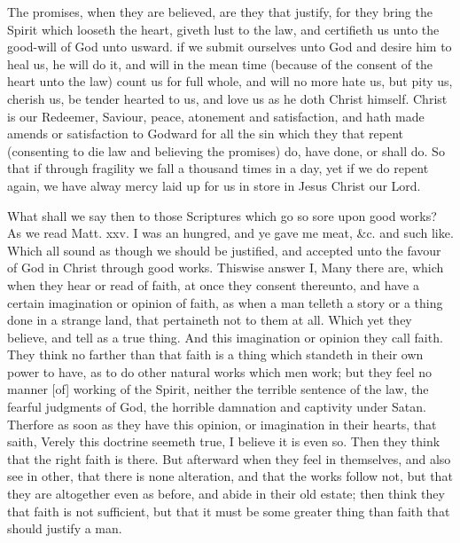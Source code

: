 The promises, when they are believed, are they that
justify, for they bring the Spirit which looseth the heart, 
giveth lust to the law, and certifieth us unto the good-will 
of God unto usward. if we submit ourselves unto God 
and desire him to heal us, he will do it, and will in the 
mean time (because of the consent of the heart unto the 
law) count us for full whole, and will no more hate us, but 
pity us, cherish us, be tender hearted to us, and love us as 
he doth Christ himself. Christ is our Redeemer, Saviour, 
peace, atonement and satisfaction, and hath made amends 
or satisfaction to Godward for all the sin which they that 
repent (consenting to die law and believing the promises) 
do, have done, or shall do. So that if through fragility 
we fall a thousand times in a day, yet if we do repent 
again, we have alway mercy laid up for us in store in Jesus 
Christ our Lord. 


What shall we say then to those Scriptures which go so 
sore upon good works? As we read Matt. xxv. I was 
an hungred, and ye gave me meat, \&c. and such like. 
Which all sound as though we should be justified, and
accepted unto the favour of God in Christ through good 
works. Thiswise answer I, Many there are, which when 
they hear or read of faith, at once they consent thereunto, 
and have a certain imagination or opinion of faith, as when 
a man telleth a story or a thing done in a strange land, that 
pertaineth not to them at all. Which yet they believe, and 
tell as a true thing. And this imagination or opinion they 
call faith. They think no farther than that faith is a thing 
which standeth in their own power to have, as to do other
natural works which men work; but they feel no manner 
[of] working of the Spirit, neither the terrible sentence 
of the law, the fearful judgments of God, the horrible 
damnation and captivity under Satan. Therfore as soon 
as they have this opinion, or imagination in their hearts, 
that saith, Verely this doctrine seemeth true, I believe it is 
even so. Then they think that the right faith is there. 
But afterward when they feel in themselves, and also see in 
other, that there is none alteration, and that the works 
follow not, but that they are altogether even as before, and 
abide in their old estate; then think they that faith is not 
sufficient, but that it must be some greater thing than faith 
that should justify a man. 

